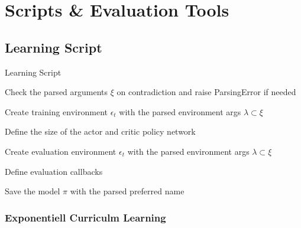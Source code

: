 \newpage

\section{Scripts \& Evaluation Tools} \label{sec:scripts}



\subsection{Learning Script}
\begin{algorithm}
	\caption{Learning Script}
	\label{alg:learn}
	 
	 Check the parsed arguments $\xi$ on contradiction and raise ParsingError if needed
	 
	 Create training environment $\epsilon_t$ with the parsed environment args $\lambda \subset \xi$
	 
	 Define the size of the actor and critic policy network
	 
	 
	 Create evaluation environment $\epsilon_t$ with the parsed environment args $\lambda \subset \xi$
	 
	 Define evaluation callbacks
	 
	 
	 Save the model $\pi$ with the parsed preferred name
	 
	 
\end{algorithm}

\newpage

\subsubsection{Exponentiell Curriculm Learning}

